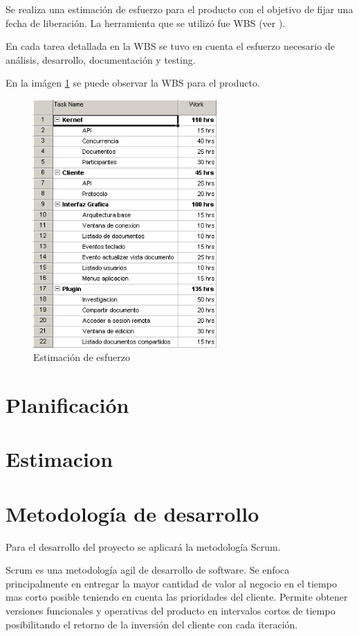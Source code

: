 \documentclass[12pt,a4paper]{article}
\begin{document}
	Se realiza una estimación de esfuerzo para el producto con el objetivo de fijar una fecha de liberación. La herramienta que se utilizó fue WBS (ver \cite{wbs}).

	En cada tarea detallada en la WBS se tuvo en cuenta el esfuerzo necesario de análisis, desarrollo, documentación y testing.

	En la imágen \ref{WBS} se puede observar la WBS para el producto.

	\begin{figure}[H]
		\begin{center}
			\includegraphics[width=7cm]{wbs.png}
			\caption{\label{WBS} Estimación de esfuerzo }
		\end{center}
	\end{figure}


	\section{Planificación}
	\section{Estimacion}
	\section{Metodología de desarrollo}
	
	Para el desarrollo del proyecto se aplicará la metodología Scrum.

	Scrum es una metodología agil de desarrollo de software. Se enfoca principalmente en entregar la mayor cantidad de valor al negocio en el tiempo mas corto posible teniendo en cuenta las prioridades del cliente. Permite obtener versiones funcionales y operativas del producto en intervalos cortos de tiempo posibilitando el retorno de la inversión del cliente con cada iteración.
	
\end{document}
